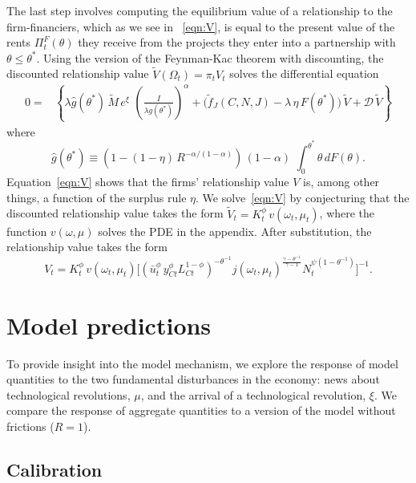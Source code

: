 \documentclass[12pt]{article}
\begin{document}
The last step involves computing the equilibrium value of a relationship to the firm-financiers, which as we see in ~\eqref{eqn:V}, is equal to the present value of the rents $\Pi_t^F(\theta)$ they receive from the projects they enter into a partnership with $\theta\leq\theta^*$. Using the version of the Feynman-Kac theorem with discounting, the discounted relationship value $\tilde V(\Omega_t) = \pi_t V_t $ solves the differential equation
\begin{align}\label{eqn:V}
0=& \left\{ \lambda \hat g(\theta^*) \, \tilde M \,e^{\xi}\,  \,\left(\frac{ I }{\lambda  g(\theta^*)}\right)^\alpha     +  \Big(\tilde f_J (C, N, J) -   \lambda\, \eta\, F (\theta^* )\Big) \, \tilde V      + \mathcal{D} \, \tilde V  \right\}
\end{align}
where
\begin{equation}\label{eqn:ghat}
\hat g (\theta^*) \equiv \left(1-(1-\eta)\,R^{-\alpha/(1-\alpha)} \right) \, (1-\alpha)\,\, \int_0^{\theta^*} \theta \, dF(\theta).
\end{equation}
Equation~\eqref{eqn:V} shows that the firms' relationship value $V$ is, among other things,  a function of the surplus rule $\eta$. We solve~\eqref{eqn:V} by conjecturing that the discounted relationship value takes the form $\tilde V_t= K^{\phi}_t \,v(\omega_t, \mu_t)$,  where the function $v(\omega, \mu)$ solves the PDE in the appendix. After substitution, the relationship value takes the form
\begin{equation}
V_t= K^{\phi}_t \,v(\omega_t, \mu_t) \Big[  \left( {  \bar u_t^\phi\, y_{Ct}^\phi L_{Ct}^{1-\phi}  } \right)^{   -\theta^{-1} }   j(\omega_t, \mu_t) ^{\frac{\gamma-\theta^{-1}}{\gamma-1} } N_t^{\psi(1-\theta^{-1})} \Big]^{-1}.
\end{equation}




\section{Model predictions}

To provide insight into the model mechanism, we explore the response of model quantities to the two fundamental disturbances in the economy: news about technological revolutions, $\mu$, and the arrival of a technological revolution, $\xi$. We compare the response of aggregate quantities to a version of the model without frictions ($R=1$).


\subsection{Calibration}
\end{document}
